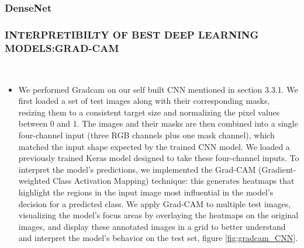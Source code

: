 \documentclass{article}
\begin{document}
\subsubsection{DenseNet}

\subsubsection{INTERPRETIBILTY OF BEST DEEP LEARNING MODELS:GRAD-CAM}\mbox{}\\

\begin{itemize}
    \item We performed Gradcam on our self built CNN mentioned in section 3.3.1. We first loaded a set of test images along with their corresponding masks, resizing them to a consistent target size and normalizing the pixel values between 0 and 1. The images and their masks are then combined into a single four-channel input (three RGB channels plus one mask channel), which matched the input shape expected by the trained CNN model. We loaded a previously trained Keras model designed to take these four-channel inputs. To interpret the model’s predictions, we implemented the Grad-CAM (Gradient-weighted Class Activation Mapping) technique: this generates heatmaps that highlight the regions in the input image most influential in the model’s decision for a predicted class. We apply Grad-CAM to multiple test images, visualizing the model’s focus areas by overlaying the heatmaps on the original images, and display these annotated images in a grid to better understand and interpret the model’s behavior on the test set, figure \ref{fig:gradcam_CNN}.
\end{itemize}
\end{document}
